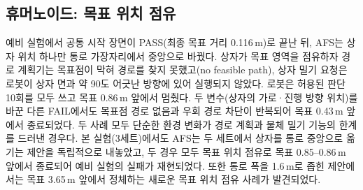 \subsection*{휴머노이드: 목표 위치 점유}
예비 실험에서 공통 시작 장면이 PASS(최종 목표 거리 0.116\,m)로 끝난 뒤, AFS는 상자 위치 하나만 통로 가장자리에서 중앙으로 바꿨다.
상자가 목표 영역을 점유하자 경로 계획기는 목표점이 막혀 경로를 찾지 못했고(no feasible path), 상자 밀기 요청은 로봇이 상자 면과 약 90도 어긋난 방향에 있어 실행되지 않았다.
로봇은 허용된 판단 10회를 모두 쓰고 목표 0.86\,m 앞에서 멈췄다. 
두 변수(상자의 가로·진행 방향 위치)를 바꾼
다른 FAIL에서도 목표점 경로 없음과 우회 경로 차단이 반복되어 목표 0.43\,m 앞에서 종료되었다.
두 사례 모두 단순한 환경 변화가 경로 계획과 물체 밀기 기능의 한계를 드러낸 경우다.
본 실험(3세트)에서도 AFS는 두 세트에서 상자를 통로 중앙으로 옮기는 제안을 독립적으로 내놓았고,
두 경우 모두 목표 위치 점유로 목표 0.85--0.86\,m 앞에서 종료되어 예비 실험의 실패가 재현되었다.
또한 통로 폭을 1.6\,m로 좁힌 제안에서는 목표 3.65\,m 앞에서 정체하는 새로운 목표 위치 점유 사례가 발견되었다.
